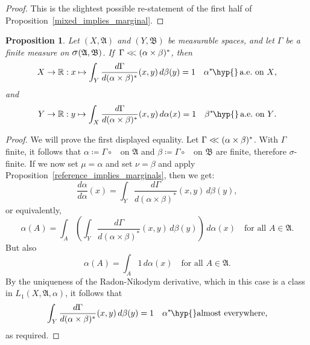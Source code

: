 \documentclass[
twoside=true,
paper=letter,
fontsize=9pt,
pagesize=auto,
leqno,
openany,
headsepline,
overfullrule,
]{scrbook}
\theoremstyle{plain}
\theoremstyle{plain}
\newtheorem{prop}[thm]{Proposition}
\theoremstyle{definition}
\theoremstyle{bfnoteitalic}
\theoremstyle{bfnoteroman}
\newcommand{\sigalg}[1]{\mathfrak{#1}}
\newcommand{\definedby}{\coloneqq}
\newcommand{\sagb}{\mathop{\hbox{\large{$\sigma$}}}\nolimits}
\newcommand{\textsigma}{\hbox{\large{$\sigma$}}\kern-1pt}
\newcommand{\preimage}[1]{\mathop{#1^{\leftarrow}}}
\newcommand{\R}{\mathbb{R}}
\newcommand{\sigmaalgebra}{\sigalg{A}}
\newcommand{\sigmaalgebraii}{\sigalg{B}}
\newcommand{\productsig}[2]{\sagb(#1,#2)}
\newcommand{\kernast}{\ast\kern-1pt}
\newcommand{\measurespace}{X}
\newcommand{\measurespaceii}{Y}
\newcommand{\mspaceelt}{x}
\newcommand{\mspaceeltii}{y}
\newcommand{\abscont}{\mathrel{< \kern-3.5pt <}}
\newcommand{\measmu}{\mu}
\newcommand{\measnu}{\nu}
\newcommand{\seti}{A}
\newcommand{\projectionone}{\pi_1}
\newcommand{\projectiontwo}{\pi_2}
\newcommand{\measonprod}{\Gamma}%
\newcommand{\marginalone}{\alpha}%
\newcommand{\marginaltwo}{\beta}%
\begin{document}
\begin{proof}
This is the slightest possible re-statement of the first half of Proposition~\ref{mixed_implies_marginal}.
\end{proof}



\begin{prop}\label{almost_a_measure}
Let
$(\measurespace, \sigmaalgebra)$
and
$(\measurespaceii, \sigmaalgebraii)$
be measurable spaces, and let  $\measonprod$ be a finite measure on
$\productsig{\sigmaalgebra}{\sigmaalgebraii}$.
If\, $\measonprod \abscont (\marginalone\times\marginaltwo)^*$, then
\[
\measurespace\to\R
:\mspaceelt\mapsto
\int_\measurespaceii \dfrac{d\measonprod}{d(\marginalone\times\marginaltwo)^*}
(\mspaceelt,\mspaceeltii)
\,d\marginaltwo(\mspaceeltii)
=
1
\quad
\text{$\marginalone^\kernast$\hyp{}\,a.e.\ on $\measurespace$,}
\]
and
\[
\measurespaceii\to\R:\mspaceeltii\mapsto
\int_\measurespace \dfrac{d\measonprod}{d(\marginalone\times\marginaltwo)^*}
(\mspaceelt,\mspaceeltii)
\,d\marginalone(\mspaceelt)
=
1
\quad
\text{$\marginaltwo^\kernast$\hyp{}\,a.e.\ on $\measurespaceii$.}
\]
\end{prop}
\begin{proof}
We will prove the first displayed equality.
Let $\measonprod\abscont(\marginalone\times\marginaltwo)^*$.
With $\measonprod$ finite, it follows that
$\marginalone\definedby
\measonprod \circ \preimage{\projectionone}$
on $\sigmaalgebra$
and
$\marginaltwo\definedby
\measonprod \circ \preimage{\projectiontwo}$
on $\sigmaalgebraii$
are finite, therefore \textsigma\hyp{}finite.
If we now set
$\measmu = \marginalone$
and set
$\measnu=\marginaltwo$ and apply Proposition~\ref{reference_implies_marginals}, then we get:
\[
\frac{d \marginalone}{d\marginalone}(\mspaceelt)
=
\int_{\measurespaceii}
\frac{d\measonprod}{d(\marginalone\times\marginaltwo)^*}
(\mspaceelt,\mspaceeltii)
\,d\marginaltwo(\mspaceeltii),
\]
or equivalently,
\[
\marginalone(\seti)
=
\int_\seti
\left(
\int_{\measurespaceii}
\frac{d\measonprod}{d(\marginalone\times\marginaltwo)^*}
(\mspaceelt,\mspaceeltii)
\,d\marginaltwo(\mspaceeltii)
\right)
\,d\marginalone(\mspaceelt)\quad\text{for all $\seti\in\sigmaalgebra$.}
\]
But also
\[
\marginalone(\seti)
=
\int_\seti
1
\,d\marginalone(\mspaceelt)\quad\text{for all $\seti\in\sigmaalgebra$.}
\]
By the uniqueness of the Radon-Nikodym derivative, which in this case is a class in
$L_1(\measurespace, \sigmaalgebra,\marginalone)$, it follows that
\[
\int_{\measurespaceii}
\frac{d\measonprod}{d(\marginalone\times\marginaltwo)^*}
(\mspaceelt,\mspaceeltii)
\,d\marginaltwo(\mspaceeltii)
= 1
\quad
\text{$\marginalone^\kernast$\hyp{}almost everywhere,}
\]
as required.
\end{proof}
\end{document}

